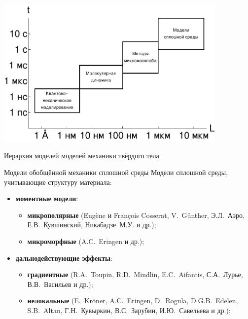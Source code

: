 \begin{frame}
	\begin{center}
	\includegraphics[width=0.85\textwidth]{pics/ModelsHierarchy.pdf}
	
	Иерархия моделей моделей механики твёрдого тела
	\end{center}
\end{frame}

\begin{frame}{Модели обобщённой механики сплошной среды}
	Модели сплошной среды, учитывающие структуру материала:
	\begin{itemize}
		\item \textbf{моментные модели}:
		\begin{itemize}
			\justifying
			\item \textbf{микрополярные} (Eugène и François Cosserat, V.~G{\"u}nther, Э.Л.~Аэро, Е.В.~Кувшинский, Никабадзе~М.У. и др.);
			\item \textbf{микроморфные} (A.C.~Eringen и др.);
		\end{itemize}
		\item \textbf{дальнодействующие эффекты}:
		\begin{itemize}
			\justifying
			\item \textbf{градиентные} (R.A.~Toupin, R.D.~Mindlin, E.C.~Aifantis, С.А.~Лурье, В.В.~Васильев и др.);
			\item \textbf{нелокальные} (E.~Kr{\"o}ner, A.C.~Eringen, D.~Rogula, D.G.B.~Edelen, S.B.~Altan, Г.Н.~Кувыркин, В.С.~Зарубин, И.Ю.~Савельева и др.);
		\end{itemize}
	\end{itemize}
\end{frame}

